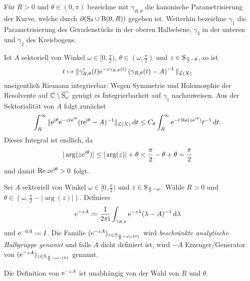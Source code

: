 \begin{ntion}
  Für $R > 0$ und $\theta \in (0,\pi)$ bezeichne mit $\gamma_{R, \theta}$ die kanonische Parametrisierung der Kurve, welche durch $\partial(\mathrm{S}_\theta \cup \mathrm{B}(0,R))$ gegeben ist.
  Weiterhin bezeichne $\gamma_1$ die Parametrisierung des Geradenstücks in der oberen Halbebene, $\gamma_3$ in der unteren und $\gamma_2$ des Kreisbogens.
\end{ntion}

\begin{obs}
  \label{obs:integrablePath}
  Ist $A$ sektoriell von Winkel $\omega \in [0,\frac{\pi}{2} )$, $\theta \in (\omega, \frac{\pi}{2})$ und $z \in \mathrm{S}_{\frac{\pi}{2} - \theta}$, so ist 
  $$
  t \mapsto \|\gamma'_{R,\theta}(t) \mathrm{e}^{-z\gamma_{R,\theta}(t)} \left( \gamma_{R, \theta}(t) - A \right)^{-1} \|_{\mathcal{L}(X)}
  $$
  uneigentlich Riemann integrierbar: 
  Wegen Symmetrie und Holomorphie der Resolvente auf $\mathbb{C} \setminus \overline{\mathrm{S}_\omega}$ genügt es Integrierbarkeit auf $\gamma_1$ nachzuweisen.
  Aus der Sektorialität von $A$ folgt zunächst
  $$
    \int_{R}^\infty \| \mathrm{e}^{\mathrm{i}\theta} \mathrm{e}^{-zt \mathrm{e}^{\mathrm{i}\theta}} ( t\mathrm{e}^{\mathrm{i}\theta} - A )^{-1} \|_{\mathcal{L}(X)} \, {\operatorname{d}\!{t}}
    \leq C_\theta \int_R^\infty \mathrm{e}^{-t \operatorname{Re}(z \mathrm{e}^{i \theta})} t^{-1} \, {\operatorname{d}\!{t}}.
  $$
  Dieses Integral ist endlich, da
  $$
  |\arg(z \mathrm{e}^{i \theta})| \leq |\arg(z)| + \theta < \frac{\pi}{2} - \theta + \theta = \frac{\pi}{2}
  $$
  und damit $\operatorname{Re}z \mathrm{e}^{\mathrm{i}\theta} > 0$ folgt.
\end{obs}

\begin{defn}
  Sei $A$ sektoriell von Winkel $\omega \in [0,\frac{\pi}{2})$ und $z \in \mathrm{S}_{\frac{\pi}{2} - \omega}$.
    Wähle $R > 0$ und $\theta \in (\omega, \frac{\pi}{2} - |\arg(z)|)$.
    Definiere
    $$
    \mathrm{e}^{-zA} \coloneqq \frac{1}{2\pi \mathrm{i}} \int_{\gamma_{R, \theta}} \mathrm{e}^{-z\lambda } (\lambda - A)^{-1} \, {\operatorname{d}\!{\lambda}}
    $$
    und $\mathrm{e}^{-0A} \coloneqq I$.
    Die Familie $(\mathrm{e}^{-zA})_{z \in \mathrm{S}_{\frac{\pi}{2} - \omega \cup \{0\}}}$  wird \emph{beschränkte analytische Halbgruppe genannt} und falls $A$ dicht definiert ist, wird $-A$ Erzeuger/Generator von $(\mathrm{e}^{-zA})_{z \in \mathrm{S}_{\frac{\pi}{2} - \omega \cup \{0\}}}$ genannt.
\end{defn}

\begin{lem}
  \label{lem:welldefinedsg}
  Die Definition von $\mathrm{e}^{-zA}$ ist unabhängig von der Wahl von $R$ und $\theta$.
\end{lem}

